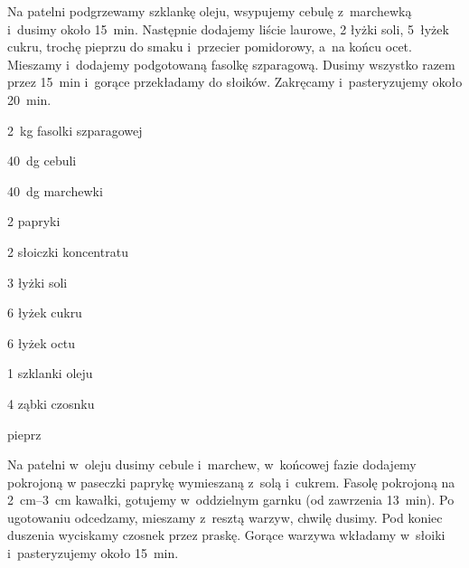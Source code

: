 \documentclass[main.tex]{subfiles}
\begin{document}
Na patelni podgrzewamy szklankę oleju, wsypujemy cebulę z~marchewką i~dusimy
około \qty{15}{\minute}. Następnie dodajemy liście laurowe, 2 łyżki soli,
5~łyżek cukru, trochę pieprzu do smaku i~przecier pomidorowy, a~na końcu ocet.
Mieszamy i~dodajemy podgotowaną fasolkę szparagową. Dusimy wszystko razem przez
\qty{15}{\minute} i~gorące przekładamy do słoików. Zakręcamy i~pasteryzujemy
około \qty{20}{\minute}.


\begin{Ingred}
    \item \qty{2}{\kilo\gram} fasolki szparagowej
    \item \qty{40}{\deka\gram} cebuli
    \item \qty{40}{\deka\gram} marchewki
    \item \num{2} papryki
    \item \num{2} słoiczki koncentratu
    \item \num{3} łyżki soli
    \item \num{6} łyżek cukru
    \item \num{6} łyżek octu
    \item \num{1} szklanki oleju
    \item \num{4} ząbki czosnku
    \item pieprz
\end{Ingred}

Na patelni w~oleju dusimy cebule i~marchew, w~końcowej fazie dodajemy pokrojoną
w paseczki paprykę wymieszaną z~solą i~cukrem. Fasolę pokrojoną na
\qtyrange{2}{3}{\centi\metre} kawałki, gotujemy w~oddzielnym garnku (od
zawrzenia \qty{13}{\minute}). Po ugotowaniu odcedzamy, mieszamy z~resztą
warzyw, chwilę dusimy. Pod koniec duszenia wyciskamy czosnek przez praskę.
Gorące warzywa wkładamy w~słoiki i~pasteryzujemy około \qty{15}{\minute}.
\end{document}
